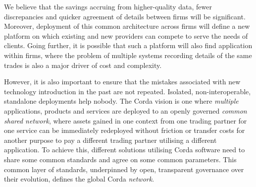 \documentclass{article}
\begin{document}
We believe that the savings accruing from higher-quality data, fewer discrepancies and quicker agreement of details between firms will be significant. Moreover, deployment of this common architecture across firms will define a new platform on which existing and new providers can compete to serve the needs of clients. Going further, it is possible that such a platform will also find application within firms, where the problem of multiple systems recording details of the same trades is also a major driver of cost and complexity.

However, it is also important to ensure that the mistakes associated with new technology introduction in the past are not repeated. Isolated, non-interoperable, standalone deployments help nobody. The Corda vision is one where \textit{multiple} applications, products and services are deployed to an openly governed \textit{common shared network}, where assets gained in one context from one trading partner for one service can be immediately redeployed without friction or transfer costs for another purpose to pay a different trading partner utilising a different application. To achieve this, different solutions utilising Corda software need to share some common standards and agree on some common parameters. This common layer of standards, underpinned by open, transparent governance over their evolution, defines the global Corda \textit{network}.
\end{document}
